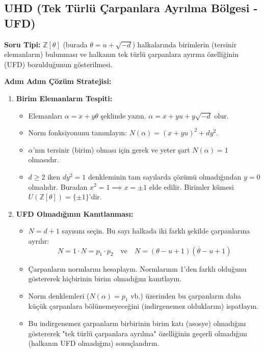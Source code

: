 \documentclass[11pt, a4paper]{article}
\begin{document}
\subsection{UHD (Tek Türlü Çarpanlara Ayrılma Bölgesi - UFD)}

\begin{konubox}[title={\faGraduationCap\enspace Soru Tipi ve Adım Adım Çözüm Stratejisi}]
\textbf{Soru Tipi:} $\mathbb{Z}[\theta]$ (burada $\theta = u + \sqrt{-d}$) halkalarında birimlerin (tersinir elemanların) bulunması ve halkanın tek türlü çarpanlara ayırma özelliğinin (UFD) bozulduğunun gösterilmesi.

\textbf{Adım Adım Çözüm Stratejisi:}
\begin{enumerate}
    \item \textbf{Birim Elemanların Tespiti:}
    \begin{itemize}
        \item Elemanları $\alpha = x + y\theta$ şeklinde yazın. $\alpha = x + yu + y\sqrt{-d}$ olur.
        \item Norm fonksiyonunu tanımlayın: $N(\alpha) = (x+yu)^2 + dy^2$.
        \item $\alpha$'nın tersinir (birim) olması için gerek ve yeter şart $N(\alpha) = 1$ olmasıdır.
        \item $d \ge 2$ iken $dy^2 = 1$ denkleminin tam sayılarda çözümü olmadığından $y=0$ olmalıdır. Buradan $x^2 = 1 \implies x = \pm 1$ elde edilir. Birimler kümesi $U(\mathbb{Z}[\theta]) = \{\pm 1\}$'dir.
    \end{itemize}
    \item \textbf{UFD Olmadığının Kanıtlanması:}
    \begin{itemize}
        \item $N = d+1$ sayısını seçin. Bu sayı halkada iki farklı şekilde çarpanlarına ayrılır:
        \[ N = 1 \cdot N = p_1 \cdot p_2 \quad \text{ve} \quad N = (\theta - u + 1)(\bar{\theta} - u + 1) \]
        \item Çarpanların normlarını hesaplayın. Normlarının 1'den farklı olduğunu göstererek hiçbirinin birim olmadığını kanıtlayın.
        \item Norm denklemleri ($N(\alpha) = p_1$ vb.) üzerinden bu çarpanların daha küçük çarpanlara bölünemeyeceğini (indirgenemez olduklarını) ispatlayın.
        \item Bu indirgenemez çarpanların birbirinin birim katı (asosye) olmadığını göstererek "tek türlü çarpanlara ayrılma" özelliğinin geçerli olmadığını (halkanın UFD olmadığını) sonuçlandırın.
    \end{itemize}
\end{enumerate}
\end{konubox}
\newpage
\end{document}
